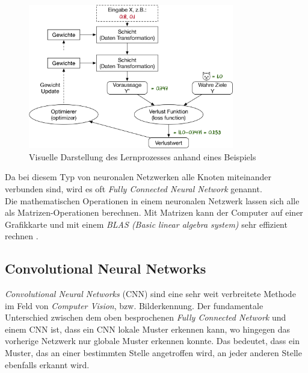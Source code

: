 \begin{figure}[hbt]
	\centering
		\includegraphics[width=0.8\textwidth]{assets/anatomy.png}
	\caption{Visuelle Darstellung des Lernprozesses anhand eines Beispiels}
	\label{img:anatomy}
\end{figure}

Da bei diesem Typ von neuronalen Netzwerken alle Knoten miteinander verbunden sind, wird es oft \textit{Fully Connected Neural Network} genannt.
\\
Die mathematischen Operationen in einem neuronalen Netzwerk lassen sich alle als Matrizen-Operationen berechnen. Mit Matrizen kann der Computer auf einer Grafikkarte und mit einem \textit{BLAS (Basic linear algebra system)} sehr effizient rechnen \parencite{neuronale_netze} .


\subsection{Convolutional Neural Networks}
\textit{Convolutional Neural Networks} (CNN) sind eine sehr weit verbreitete Methode im Feld von \textit{Computer Vision}, bzw. Bilderkennung. Der fundamentale Unterschied zwischen dem oben besprochenen \textit{Fully Connected Network} und einem CNN ist, dass ein CNN lokale Muster erkennen kann, wo hingegen das vorherige Netzwerk nur globale Muster erkennen konnte. Das bedeutet, dass ein Muster, das an einer bestimmten Stelle angetroffen wird, an jeder anderen Stelle ebenfalls erkannt wird. \parencite{chollet}

